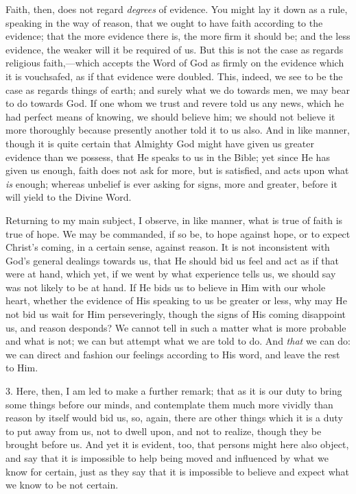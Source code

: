 Faith, then, does not regard \emph{degrees} of evidence. You might
lay it down as a rule, speaking in the way of reason, that we ought to
have faith according to the evidence; that the more evidence there is,
the more firm it should be; and the less evidence, the weaker will it
be required of us. But this is not the case as regards religious
faith,—which accepts the Word of God as firmly on the evidence which
it is vouchsafed, as if that evidence were doubled. This, indeed, we
see to be the case as regards things of earth; and surely what we
do
towards men, we may bear to do towards God. If one whom we trust and
revere told us any news, which he had perfect means of knowing, we
should believe him; we should not believe it more thoroughly because
presently another told it to us also. And in like manner, though it is
quite certain that Almighty God might have given us greater evidence
than we possess, that He speaks to us in the Bible; yet since He has
given us enough, faith does not ask for more, but is satisfied, and
acts upon what \emph{is} enough; whereas unbelief is ever asking for
signs, more and greater, before it will yield to the Divine Word.

Returning to my main subject, I observe, in like manner, what is
true of faith is true of hope. We may be commanded, if so be, to hope
against hope, or to expect Christ's coming, in a certain sense,
against reason. It is not inconsistent with God's general dealings
towards us, that He should bid us feel and act as if that were at
hand, which yet, if we went by what experience tells us, we should say
was not likely to be at hand. If He bids us to believe in Him with our
whole heart, whether the evidence of His speaking to us be greater or
less, why may He not bid us wait for Him perseveringly, though the
signs of His coming disappoint us, and reason desponds? We cannot tell
in such a matter what is more probable and what is not; we can but
attempt what we are told to do. And \emph{that} we can do: we can
direct and fashion our feelings according to His word, and leave the
rest to Him.

3. Here, then, I am led to make a further remark; that as it is our
duty to bring some things before our minds, and contemplate them much
more vividly than reason by itself would bid us, so, again, there are
other things which it is a duty to put away from us, not to dwell
upon, and not to realize, though they be brought before us. And yet it
is evident, too, that persons might here also object, and say that it
is impossible to help being moved and influenced by what we know for
certain, just as they say that it is impossible to believe and expect
what we know to be not certain.

